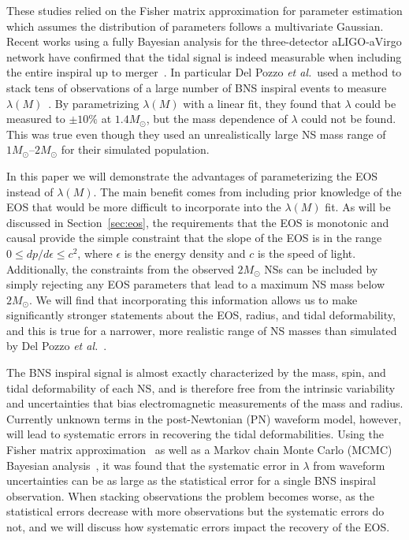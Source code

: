\documentclass[twocolumn,prd,amssymb,aps,nofootinbib,showpacs,epsf]{revtex4}
\begin{document}
These studies relied on the Fisher matrix approximation for parameter estimation which assumes the distribution of parameters follows a multivariate Gaussian. Recent works using a fully Bayesian analysis for the three-detector aLIGO-aVirgo network have confirmed that the tidal signal is indeed measurable when including the entire inspiral up to merger~\cite{DelPozzoLiAgathos2013, WadeCreightonOchsner2014}. In particular Del Pozzo {\it et al.}\ used a method to stack tens of observations of a large number of BNS inspiral events to measure $\lambda(M)$~\cite{DelPozzoLiAgathos2013}. By parametrizing $\lambda(M)$ with a linear fit, they found that $\lambda$ could be measured to $\pm 10\%$ at $1.4M_\odot$, but the mass dependence of $\lambda$ could not be found. This was true even though they used an unrealistically large NS mass range of $1M_\odot$--$2M_\odot$ for their simulated population.

In this paper we will demonstrate the advantages of parameterizing the EOS instead of $\lambda(M)$. The main benefit comes from including prior knowledge of the EOS that would be more difficult to incorporate into the $\lambda(M)$ fit. As will be discussed in Section~\ref{sec:eos}, the requirements that the EOS is monotonic and causal provide the simple constraint that the slope of the EOS is in the range $0 \le dp/d\epsilon \le c^2$, where $\epsilon$ is the energy density and $c$ is the speed of light. Additionally, the constraints from the observed $2M_\odot$ NSs can be included by simply rejecting any EOS parameters that lead to a maximum NS mass below $2M_\odot$. We will find that incorporating this information allows us to make significantly stronger statements about the EOS, radius, and tidal deformability, and this is true for a narrower, more realistic range of NS masses than simulated by Del Pozzo {\it et al.}~\cite{DelPozzoLiAgathos2013}.

The BNS inspiral signal is almost exactly characterized by the mass, spin, and tidal deformability of each NS, and is therefore free from the intrinsic variability and uncertainties that bias electromagnetic measurements of the mass and radius. Currently unknown terms in the post-Newtonian (PN) waveform model, however, will lead to systematic errors in recovering the tidal deformabilities. Using the Fisher matrix approximation~\cite{Favata2014, YagiYunes2014} as well as a Markov chain Monte Carlo (MCMC) Bayesian analysis~\cite{WadeCreightonOchsner2014}, it was found that the systematic error in $\lambda$ from waveform uncertainties can be as large as the statistical error for a single BNS inspiral observation. When stacking observations the problem becomes worse, as the statistical errors decrease with more observations but the systematic errors do not, and we will discuss how systematic errors impact the recovery of the EOS.
\end{document}
